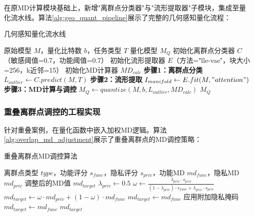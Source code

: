在原MD计算模块基础上，新增"离群点分类器"与"流形提取器"子模块，集成至量化流水线。算法\ref{alg:geo_quant_pipeline}展示了完整的几何感知量化流程：

\begin{algorithm}[h]
\caption{几何感知量化流水线}
\label{alg:geo_quant_pipeline}
\begin{algorithmic}[1]
\REQUIRE 原始模型 $M$，量化比特数 $b$，任务类型 $T$
\ENSURE 量化模型 $M_Q$
\STATE 初始化离群点分类器 $C$（敏感阈值=0.7，功能阈值=0.7）
\STATE 初始化流形提取器 $E$（方法="lle-vae"，块大小=256，k近邻=15）
\STATE 初始化MD计算器 $MD_{calc}$
\STATE
\STATE \textbf{步骤1：离群点分类}
\STATE $L_{outlier} \leftarrow C.predict(M, T)$ 
\STATE
\STATE \textbf{步骤2：流形提取}
\STATE $I_{manifold} \leftarrow E.fit(M, "attention")$ 
\STATE
\STATE \textbf{步骤3：MD计算与调控}
\STATE $M_Q \leftarrow quantize(M, b, L_{outlier}, MD_{calc})$
\RETURN $M_Q$
\end{algorithmic}
\end{algorithm}

\subsubsection{重叠离群点调控的工程实现}

针对重叠案例，在量化函数中嵌入加权MD逻辑。算法\ref{alg:overlap_md_adjustment}展示了重叠离群点的MD调控策略：

\begin{algorithm}[h]
\caption{重叠离群点MD调控算法}
\label{alg:overlap_md_adjustment}
\begin{algorithmic}[1]
\REQUIRE 离群点类型 $type$，功能评分 $s_{func}$，隐私评分 $s_{priv}$，功能MD $md_{func}$，隐私MD $md_{priv}$
\ENSURE 调整后的MD值 $md_{target}$
    \STATE $\lambda_{priv} \leftarrow 0.5$ 
    \STATE $\omega \leftarrow \frac{\lambda_{priv} \cdot s_{priv}}{(1-\lambda_{priv}) \cdot s_{func} + \lambda_{priv} \cdot s_{priv}}$
    \STATE $md_{target} \leftarrow \omega \cdot md_{priv} + (1-\omega) \cdot md_{func}$
    \STATE $md_{target} \leftarrow md_{func}$ 
    \STATE 应用附加隐私掩码
\ELSE
    \STATE $md_{target} \leftarrow md_{func}$ 
\ENDIF
\RETURN $md_{target}$
\end{algorithmic}
\end{algorithm}

